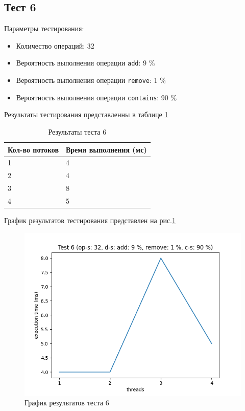 \subsection*{Тест 6}

Параметры тестирования:

\begin{itemize}
    \item Количество операций: 32
    \item Вероятность выполнения операции \verb|add|: 9 \%
    \item Вероятность выполнения операции \verb|remove|: 1 \%
    \item Вероятность выполнения операции \verb|contains|: 90 \%
\end{itemize}

Результаты тестирования представленны в таблице \ref{tab:results6}


\begin{table}[H]
    \centering
    \begin{tabular}{|l|l|}
        \hline
        Кол-во потоков & Время выполнения (мс) \\
        \hline
        1 & 4 \\
        \hline
        2 & 4 \\
        \hline
        3 & 8 \\
        \hline
        4 & 5 \\
        \hline
    \end{tabular}
    \caption{Результаты теста 6}
    \label{tab:results6}
\end{table}
        

График результатов тестирования представлен на рис.\ref{fig:plot6}

\begin{figure}[H]
    \centering
    \includegraphics[width=0.7\linewidth]{photo/plot6}
    \caption{График результатов теста 6}
    \label{fig:plot6}
\end{figure}

